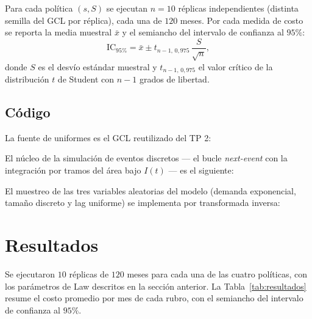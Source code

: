 \documentclass[11pt]{article}
\begin{document}
Para cada pol\'itica $(s, S)$ se ejecutan $n = 10$ r\'eplicas independientes
(distinta semilla del GCL por r\'eplica), cada una de $120$ meses. Por cada
medida de costo se reporta la media muestral $\bar{x}$ y el semiancho del
intervalo de confianza al $95\%$:
\begin{equation}
\text{IC}_{95\%} = \bar{x} \pm t_{n-1,\,0{,}975}\,\frac{S}{\sqrt{n}},
\end{equation}
donde $S$ es el desv\'io est\'andar muestral y $t_{n-1,\,0{,}975}$ el valor
cr\'itico de la distribuci\'on $t$ de Student con $n-1$ grados de libertad.

\subsection{C\'odigo}

La fuente de uniformes es el GCL reutilizado del TP 2:



El n\'ucleo de la simulaci\'on de eventos discretos --- el bucle
\emph{next-event} con la integraci\'on por tramos del \'area bajo $I(t)$ ---
es el siguiente:



El muestreo de las tres variables aleatorias del modelo (demanda exponencial,
tama\~no discreto y lag uniforme) se implementa por transformada inversa:



\section{Resultados}

Se ejecutaron $10$ r\'eplicas de $120$ meses para cada una de las cuatro
pol\'iticas, con los par\'ametros de Law descritos en la secci\'on anterior.
La Tabla~\ref{tab:resultados} resume el costo promedio por mes de cada rubro,
con el semiancho del intervalo de confianza al $95\%$.
\end{document}
